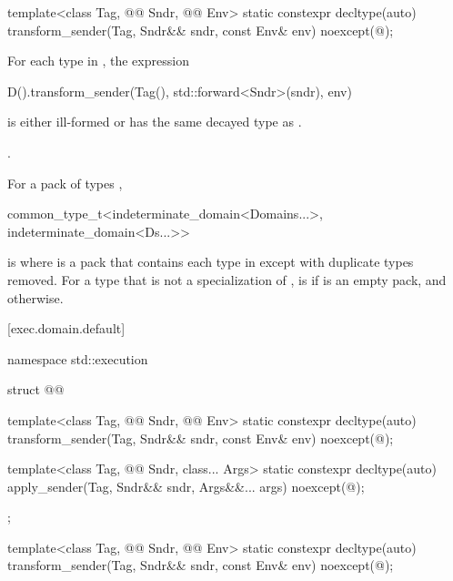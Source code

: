 %
\begin{itemdecl}
template<class Tag, @@ Sndr, @@ Env>
  static constexpr decltype(auto) transform_sender(Tag, Sndr&& sndr, const Env& env)
    noexcept(@\seebelow@);
\end{itemdecl}

\begin{itemdescr}
\pnum
\mandates
For each type  in ,
the expression
\begin{codeblock}
D().transform_sender(Tag(), std::forward<Sndr>(sndr), env)
\end{codeblock}
is either ill-formed or has the same decayed type as
.

\pnum
\returns
{}.

\pnum
\remarks
For a pack of types ,
\begin{codeblock}
common_type_t<indeterminate_domain<Domains...>, indeterminate_domain<Ds...>>
\end{codeblock}
is 
where  is a pack that contains each type in
 except with duplicate types removed.
For a type  that is not a specialization of ,
is  if  is an empty pack, and
otherwise.
\end{itemdescr}

[exec.domain.default]{}

\pnum
\begin{codeblock}
namespace std::execution {
  struct @@ {
    template<class Tag, @@ Sndr, @@ Env>
      static constexpr decltype(auto) transform_sender(Tag, Sndr&& sndr, const Env& env)
        noexcept(@\seebelow@);

    template<class Tag, @@ Sndr, class... Args>
      static constexpr decltype(auto) apply_sender(Tag, Sndr&& sndr, Args&&... args)
        noexcept(@\seebelow@);
  };
}
\end{codeblock}

%
\begin{itemdecl}
template<class Tag, @@ Sndr, @@ Env>
  static constexpr decltype(auto) transform_sender(Tag, Sndr&& sndr, const Env& env)
    noexcept(@\seebelow@);
\end{itemdecl}

